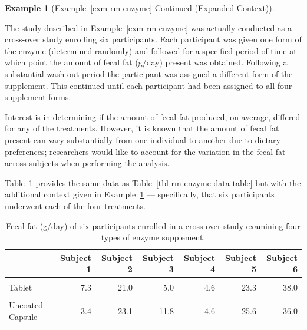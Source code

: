 \documentclass[
  letterpaper,
  DIV=11,
  numbers=noendperiod]{scrreprt}
\theoremstyle{definition}
\newtheorem{example}{Example}[chapter]
\theoremstyle{definition}
\theoremstyle{remark}
\begin{document}
\begin{example}[Example~\ref{exm-rm-enzyme} Continued (Expanded
Context)]\protect\hypertarget{exm-rm-enzyme-expanded}{}\label{exm-rm-enzyme-expanded}

The study described in Example~\ref{exm-rm-enzyme} was actually
conducted as a cross-over study enrolling six participants. Each
participant was given one form of the enzyme (determined randomly) and
followed for a specified period of time at which point the amount of
fecal fat (g/day) present was obtained. Following a substantial wash-out
period the participant was assigned a different form of the supplement.
This continued until each participant had been assigned to all four
supplement forms.

Interest is in determining if the amount of fecal fat produced, on
average, differed for any of the treatments. However, it is known that
the amount of fecal fat present can vary substantially from one
individual to another due to dietary preferences; researchers would like
to account for the variation in the fecal fat across subjects when
performing the analysis.

\end{example}

Table~\ref{tbl-rm-enzyme-data-table-expanded} provides the same data as
Table~\ref{tbl-rm-enzyme-data-table} but with the additional context
given in Example~\ref{exm-rm-enzyme-expanded} --- specifically, that six
participants underwent each of the four treatments.

\hypertarget{tbl-rm-enzyme-data-table-expanded}{}
\begin{table}
\caption{\label{tbl-rm-enzyme-data-table-expanded}Fecal fat (g/day) of six participants enrolled in a cross-over study
examining four types of enzyme supplement. }\tabularnewline

\centering
\begin{tabular}[t]{lrrrrrr}
\toprule
  & Subject 1 & Subject 2 & Subject 3 & Subject 4 & Subject 5 & Subject 6\\
\midrule
\cellcolor{gray!6}{Placebo} & \cellcolor{gray!6}{44.5} & \cellcolor{gray!6}{33.0} & \cellcolor{gray!6}{19.1} & \cellcolor{gray!6}{9.4} & \cellcolor{gray!6}{71.3} & \cellcolor{gray!6}{51.2}\\
Tablet & 7.3 & 21.0 & 5.0 & 4.6 & 23.3 & 38.0\\
\cellcolor{gray!6}{Coated Capsule} & \cellcolor{gray!6}{12.4} & \cellcolor{gray!6}{25.6} & \cellcolor{gray!6}{22.0} & \cellcolor{gray!6}{5.8} & \cellcolor{gray!6}{68.2} & \cellcolor{gray!6}{52.6}\\
Uncoated Capsule & 3.4 & 23.1 & 11.8 & 4.6 & 25.6 & 36.0\\
\bottomrule
\end{tabular}
\end{table}
\end{document}
